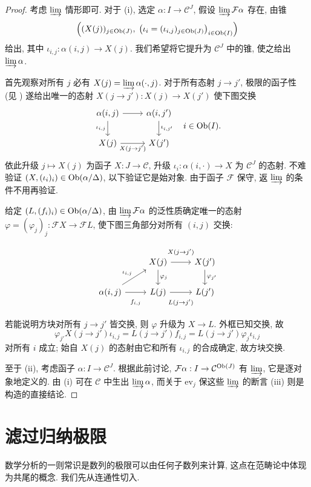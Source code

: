 \begin{proof}
	考虑 $\varinjlim$ 情形即可. 对于 (i), 选定 $\alpha: I \to \mathcal{C}^J$, 假设 $\varinjlim \mathcal{F}\alpha$ 存在, 由锥
	\[ \left( (X(j))_{j \in \operatorname{Ob}(J)}, \; \left( \iota_i = (\iota_{i, j})_{j \in \operatorname{Ob}(J)} \right)_{i \in \operatorname{Ob}(I)} \right) \]
	给出, 其中 $\iota_{i,j}: \alpha(i, j) \to X(j)$. 我们希望将它提升为 $\mathcal{C}^J$ 中的锥, 使之给出 $\varinjlim \alpha$.
	
	首先观察对所有 $j$ 必有 $X(j) = \varinjlim \alpha(\cdot, j)$. 对于所有态射 $j \to j'$, 极限的函子性 (见 \cite[引理 2.7.4]{Li1}) 遂给出唯一的态射 $X(j \to j'): X(j) \to X(j')$ 使下图交换
	\[\begin{tikzcd}
		\alpha(i, j) \arrow[r] \arrow[d, "{\iota_{i, j}}"'] & \alpha(i, j') \arrow[d, "{\iota_{i, j'}}"] \\
		X(j) \arrow[r, "{X(j \to j')}"'] & X(j')
	\end{tikzcd} \quad i \in \Obj(I). \]
	依此升级 $j \mapsto X(j)$ 为函子 $X: J \to \mathcal{C}$, 升级 $\iota_i: \alpha(i, \cdot) \to X$ 为 $\mathcal{C}^J$ 的态射. 不难验证 $(X, (\iota_i)_i) \in \operatorname{Ob}(\alpha/\Delta)$, 以下验证它是始对象. 由于函子 $\mathcal{F}$ 保守, 返 $\varinjlim$ 的条件不用再验证.

	给定 $(L, (f_i)_i) \in \operatorname{Ob}(\alpha/\Delta)$, 由 $\varinjlim \mathcal{F}\alpha$ 的泛性质确定唯一的态射 $\varphi = (\varphi_j)_j : \mathcal{F}X \to \mathcal{F}L$, 使下图三角部分对所有 $(i, j)$ 交换:
	\[\begin{tikzcd}
		& X(j) \arrow[d, "\varphi_j"] \arrow[r, "{X(j \to j')}" inner sep=0.8em] & X(j') \arrow[d, "\varphi_{j'}"] \\
		\alpha(i, j) \arrow[ru, "{\iota_{i,j}}"] \arrow[r, "f_{i, j}"' inner sep=0.8em] & L(j) \arrow[r, "{L(j \to j')}"' inner sep=0.8em] & L(j')
	\end{tikzcd}\]
	若能说明方块对所有 $j \to j'$ 皆交换, 则 $\varphi$ 升级为 $X \to L$. 外框已知交换, 故
	\[ \varphi_{j'} X(j \to j') \iota_{i, j} = L(j \to j') f_{i, j} = L(j \to j') \varphi_j \iota_{i, j} \]
	对所有 $i$ 成立; 始自 $X(j)$ 的态射由它和所有 $\iota_{i,j}$ 的合成确定, 故方块交换.

	至于 (ii), 考虑函子 $\alpha: I \to \mathcal{C}^J$. 根据此前讨论, $\mathcal{F}\alpha: I \to \mathcal{C}^{\operatorname{Ob}(J)}$ 有 $\varinjlim$, 它是逐对象地定义的. 由 (i) 可在 $\mathcal{C}$ 中生出 $\varinjlim \alpha$, 而关于 $\mathrm{ev}_j$ 保这些 $\varinjlim$ 的断言 (iii) 则是构造的直接结论.
\end{proof}

\section{滤过归纳极限}\label{sec:filtered-indlim}
数学分析的一则常识是数列的极限可以由任何子数列来计算, 这点在范畴论中体现为共尾的概念. 我们先从连通性切入.

